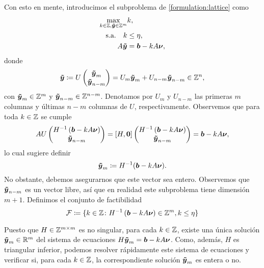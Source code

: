 Con esto en mente, introducimos el subproblema de \eqref{formulation:lattice} como
\begin{subequations}
	\label{subformulation:lattice}
	\begin{align}
		\max_{k \in \mathbb{Z}, \boldsymbol{\tilde{y}} \in \mathbb{Z}^m}
			& k, \\
		\text{s.a.} \quad
		k &\leq \eta, \\
			A\boldsymbol{\tilde{y}} &= \boldsymbol{b} - kA\boldsymbol{\nu},
	\end{align}
\end{subequations}
donde 
\begin{equation}
	\label{eq:tvecy}
	\boldsymbol{\tilde{y}} \coloneq U \begin{pmatrix} \boldsymbol{\tilde{y}}_m \\ \boldsymbol{\tilde{y}}_{n-m} \end{pmatrix}
	= U_m\boldsymbol{\tilde{y}}_m + U_{n-m}\boldsymbol{\tilde{y}}_{n-m} \in \mathbb{Z}^n,
\end{equation}
con $\boldsymbol{\tilde{y}}_m \in \mathbb{Z}^m$ y $\boldsymbol{\tilde{y}}_{n-m} \in \mathbb{Z}^{n-m}$. Denotamos por $U_m$ y
$U_{n-m}$ las primeras $m$ columnas y últimas $n - m$ columnas de $U$, respectivamente.
Observemos que para toda $k \in \mathbb{Z}$ se cumple
\begin{equation}
	AU \begin{pmatrix} H^{-1}\left(\boldsymbol{b} - kA\boldsymbol{\nu}\right) \\ \boldsymbol{\tilde{y}}_{n-m} \end{pmatrix}
	=
	[H, \boldsymbol{0}] \begin{pmatrix} H^{-1}\left(\boldsymbol{b} - kA\boldsymbol{\nu}\right) \\ \boldsymbol{\tilde{y}}_{n-m} \end{pmatrix}
	= \boldsymbol{b} - kA\boldsymbol{\nu},
\end{equation}
lo cual sugiere definir
\begin{equation}
	\label{eq:ym}
	\boldsymbol{\tilde{y}}_m \coloneq H^{-1}(\boldsymbol{b} - kA\boldsymbol{\nu}).
\end{equation}
No obstante, debemos asegurarnos que este vector sea entero. Observemos que $\boldsymbol{\tilde{y}}_{n-m}$ es un
vector libre, así que en realidad este subproblema tiene dimensión $m + 1$. Definimos el conjunto de
factibilidad
\begin{equation}
	\label{eq:feas-set}
	\mathcal{F} \coloneq \lbrace 
		k \in \mathbb{Z} \colon H^{-1}\left(\boldsymbol{b} - kA\boldsymbol{\nu}\right) \in \mathbb{Z}^m, k \leq \eta
	 \rbrace
\end{equation}

Puesto que $H \in \mathbb{Z}^{m \times m}$ es no singular, para cada $k \in \mathbb{Z}$, existe una única solución
$\boldsymbol{\tilde{y}}_m \in \mathbb{R}^m$ del sistema de ecuaciones $H\boldsymbol{\tilde{y}}_m = \boldsymbol{b} - kA\boldsymbol{\nu}$. Como, además, $H$
es triangular inferior, podemos resolver rápidamente este sistema de ecuaciones y verificar si, para
cada $k \in \mathbb{Z}$, la correspondiente solución $\boldsymbol{\tilde{y}}_m$ es entera o no.

